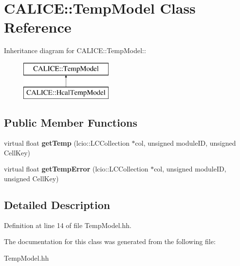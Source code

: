 \section{CALICE::TempModel Class Reference}
\label{classCALICE_1_1TempModel}
Inheritance diagram for CALICE::TempModel::\begin{figure}[H]
\begin{center}
\leavevmode
\includegraphics[height=2cm]{classCALICE_1_1TempModel}
\end{center}
\end{figure}
\subsection*{Public Member Functions}
\begin{DoxyCompactItemize}
\item 
virtual float {\bfseries getTemp} (lcio::LCCollection $\ast$col, unsigned moduleID, unsigned CellKey)\label{classCALICE_1_1TempModel_ad1cc8ffc2484c36beed93c4191b8e7e6}

\item 
virtual float {\bfseries getTempError} (lcio::LCCollection $\ast$col, unsigned moduleID, unsigned CellKey)\label{classCALICE_1_1TempModel_a8fab6288f361da8d51cb2b045497dd56}

\end{DoxyCompactItemize}


\subsection{Detailed Description}


Definition at line 14 of file TempModel.hh.

The documentation for this class was generated from the following file:\begin{DoxyCompactItemize}
\item 
TempModel.hh\end{DoxyCompactItemize}
